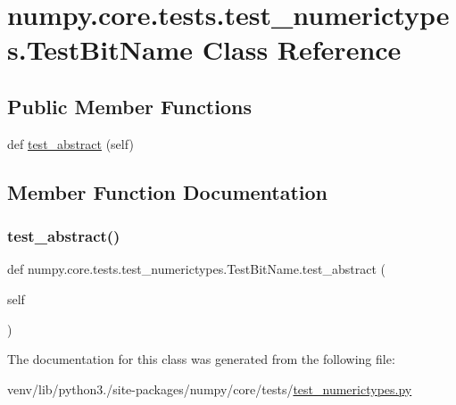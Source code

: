 \hypertarget{classnumpy_1_1core_1_1tests_1_1test__numerictypes_1_1TestBitName}{}\section{numpy.\+core.\+tests.\+test\+\_\+numerictypes.\+Test\+Bit\+Name Class Reference}
\label{classnumpy_1_1core_1_1tests_1_1test__numerictypes_1_1TestBitName}
\subsection*{Public Member Functions}
\begin{DoxyCompactItemize}
\item 
def \hyperlink{classnumpy_1_1core_1_1tests_1_1test__numerictypes_1_1TestBitName_a8f1e8a05075bbe5af0ec8c04d2af3a7f}{test\+\_\+abstract} (self)
\end{DoxyCompactItemize}


\subsection{Member Function Documentation}
\mbox{\label{classnumpy_1_1core_1_1tests_1_1test__numerictypes_1_1TestBitName_a8f1e8a05075bbe5af0ec8c04d2af3a7f}} 
\subsubsection{\texorpdfstring{test\+\_\+abstract()}{test\_abstract()}}
{\footnotesize\ttfamily def numpy.\+core.\+tests.\+test\+\_\+numerictypes.\+Test\+Bit\+Name.\+test\+\_\+abstract (\begin{DoxyParamCaption}\item[{}]{self }\end{DoxyParamCaption})}



The documentation for this class was generated from the following file\+:\begin{DoxyCompactItemize}
\item 
venv/lib/python3./site-\/packages/numpy/core/tests/\hyperlink{test__numerictypes_8py}{test\+\_\+numerictypes.\+py}\end{DoxyCompactItemize}
